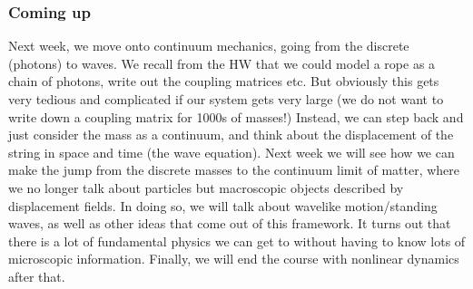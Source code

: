 \subsubsection{Coming up}
Next week, we move onto continuum mechanics, going from the discrete (photons) to waves. We recall from the HW that we could model a rope as a chain of photons, write out the coupling matrices etc. But obviously this gets very tedious and complicated if our system gets very large (we do not want to write down a coupling matrix for 1000s of masses!) Instead, we can step back and just consider the mass as a continuum, and think about the displacement of the string in space and time (the wave equation). Next week we will see how we can make the jump from the discrete masses to the continuum limit of matter, where we no longer talk about particles but macroscopic objects described by displacement fields. In doing so, we will talk about wavelike motion/standing waves, as well as other ideas that come out of this framework. It turns out that there is a lot of fundamental physics we can get to without having to know lots of microscopic information. Finally, we will end the course with nonlinear dynamics after that.